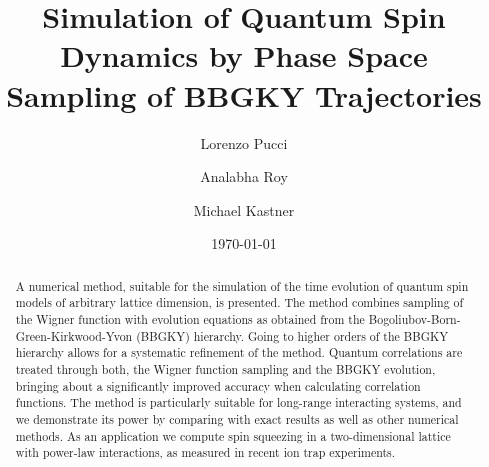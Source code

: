 \documentclass[aps,prl,showpacs,amsmath,amssymb,superscriptaddress,reprint,10pt]{revtex4-1}
\begin{document}

\title{Simulation of Quantum Spin Dynamics by Phase Space Sampling of BBGKY Trajectories}  

\author{Lorenzo Pucci} 

\author{Analabha Roy} 

\author{Michael Kastner} 

\date{\today}

\begin{abstract}
A numerical method, suitable for the simulation of the time evolution of quantum spin models of arbitrary lattice dimension, is presented. The method combines sampling of the Wigner function with evolution equations as obtained from the Bogoliubov-Born-Green-Kirkwood-Yvon (BBGKY) hierarchy. Going to higher orders of the BBGKY hierarchy allows for a systematic refinement of the method. Quantum correlations are treated through both, the Wigner function sampling and the BBGKY evolution, bringing about a significantly improved accuracy when calculating correlation functions. The method is particularly suitable for long-range interacting systems, and we demonstrate its power by comparing with exact results as well as other numerical methods. As an application we compute spin squeezing in a two-dimensional lattice with power-law interactions, as measured in recent ion trap experiments.
\end{abstract}


\maketitle 
\end{document}
